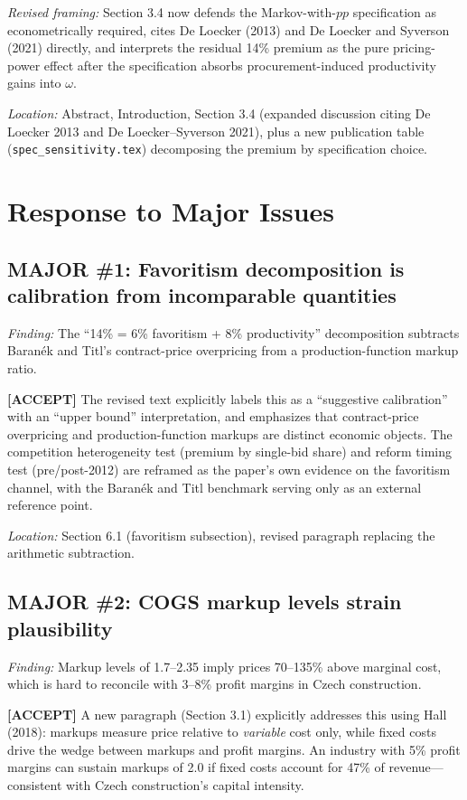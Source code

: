 \documentclass[11pt]{article}
\newcommand{\accept}{\textcolor{accept}{\textbf{[ACCEPT]}}}
\begin{document}
\textit{Revised framing:} Section 3.4 now defends the Markov-with-$pp$ specification as econometrically required, cites De Loecker (2013) and De Loecker and Syverson (2021) directly, and interprets the residual 14\% premium as the pure pricing-power effect after the specification absorbs procurement-induced productivity gains into $\omega$.

\textit{Location:} Abstract, Introduction, Section 3.4 (expanded discussion citing De Loecker 2013 and De Loecker--Syverson 2021), plus a new publication table (\texttt{spec\_sensitivity.tex}) decomposing the premium by specification choice.

\section{Response to Major Issues}

\subsection*{MAJOR \#1: Favoritism decomposition is calibration from incomparable quantities}

\textit{Finding:} The ``14\% = 6\% favoritism + 8\% productivity'' decomposition subtracts Baran\'{e}k and Titl's contract-price overpricing from a production-function markup ratio.

\accept{} The revised text explicitly labels this as a ``suggestive calibration'' with an ``upper bound'' interpretation, and emphasizes that contract-price overpricing and production-function markups are distinct economic objects. The competition heterogeneity test (premium by single-bid share) and reform timing test (pre/post-2012) are reframed as the paper's own evidence on the favoritism channel, with the Baran\'{e}k and Titl benchmark serving only as an external reference point.

\textit{Location:} Section 6.1 (favoritism subsection), revised paragraph replacing the arithmetic subtraction.

\subsection*{MAJOR \#2: COGS markup levels strain plausibility}

\textit{Finding:} Markup levels of 1.7--2.35 imply prices 70--135\% above marginal cost, which is hard to reconcile with 3--8\% profit margins in Czech construction.

\accept{} A new paragraph (Section 3.1) explicitly addresses this using Hall (2018): markups measure price relative to \emph{variable} cost only, while fixed costs drive the wedge between markups and profit margins. An industry with 5\% profit margins can sustain markups of 2.0 if fixed costs account for 47\% of revenue---consistent with Czech construction's capital intensity.
\end{document}
